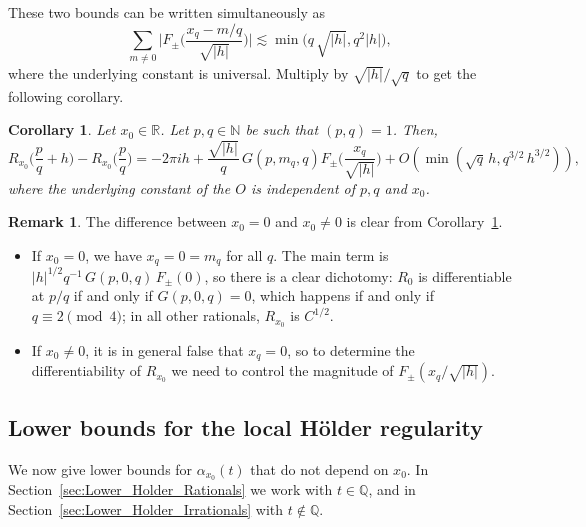 \documentclass[11pt,reqno]{amsart}
\newtheorem{cor}[thm]{Corollary}
\theoremstyle{definition}
\newtheorem{rem}[thm]{Remark}
\begin{document}
These two bounds can be written simultaneously as
\begin{equation}
\sum_{m \neq 0} \Big|  F_\pm \Big( \frac{x_q - m/q}{\sqrt{|h|}} \Big) \Big|  \lesssim \min \big(  q \, \sqrt{|h|},  q^2 |h| \big),
\end{equation}
where the underlying constant is universal. 
Multiply by $\sqrt{|h|} / \sqrt{q}$ to get the following corollary.
\begin{cor}\label{thm:CorollaryAsymptotic}
Let $x_0 \in \mathbb R$.
Let $p,q \in \mathbb N$ be such that $(p,q)=1$. Then, 
\begin{equation}
R_{x_0}\Big( \frac{p}{q} + h  \Big)  - R_{x_0}\Big( \frac{p}{q} \Big)  
= - 2\pi i h + \frac{\sqrt{|h|}}{q} \,  G(p,m_q,q) F_\pm \Big( \frac{x_q}{\sqrt{|h|}} \Big)  + O\left( \min \left( \sqrt{q} \, h , q^{3/2}\, h^{3/2}  \right) \right),
\end{equation}
where the underlying constant of the $O$ is independent of $p, q$ and $x_0$.  
\end{cor}

\begin{rem}\label{thm:Remark_MainTerm}
The difference between $x_0 = 0$ and $x_0 \neq 0$ is clear from Corollary~\ref{thm:CorollaryAsymptotic}.
\begin{itemize}
	\item
	 If $x_0 = 0$, we have $x_q = 0 = m_q$ for all $q$. 
The main term is 
$|h|^{1/2} q^{-1} \, G(p,0,q) \, F_\pm(0)$, so there is a clear dichotomy: 
$R_0$ is differentiable at $p/q$ if and only if $G(p,0,q) = 0$, which happens if and only if $q \equiv 2 \pmod{4}$; 
in all other rationals, $R_{x_0}$ is $C^{1/2}$.  
	
	\item
	 If $x_0 \neq 0$, it is in general false that $x_q = 0$, so to determine the differentiability of $R_{x_0}$ we need to control the magnitude of $F_\pm(x_q/\sqrt{|h|})$. 
\end{itemize}
\end{rem}







\subsection{Lower bounds for the local H\"older regularity}
\label{sec:Lower_Bounds}

We now give lower bounds for $\alpha_{x_0}(t)$
that do not depend on $x_0$.  
In Section~\ref{sec:Lower_Holder_Rationals} we work with $t \in \mathbb Q$, 
and in Section~\ref{sec:Lower_Holder_Irrationals} with $t \not\in \mathbb Q$.  
\end{document}
